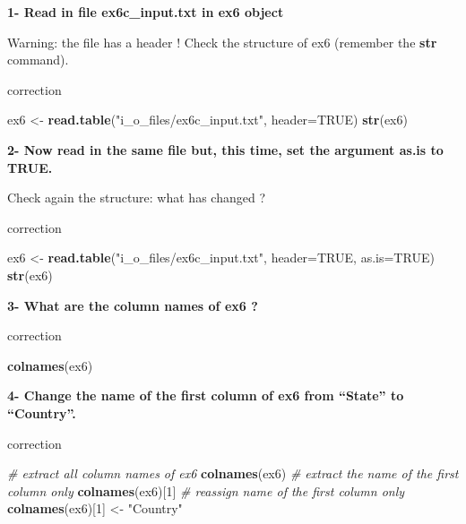 \documentclass[]{book}
\newenvironment{Shaded}{\begin{snugshade}}{\end{snugshade}}
\newcommand{\CommentTok}[1]{\textcolor[rgb]{0.56,0.35,0.01}{\textit{#1}}}
\newcommand{\DataTypeTok}[1]{\textcolor[rgb]{0.13,0.29,0.53}{#1}}
\newcommand{\DecValTok}[1]{\textcolor[rgb]{0.00,0.00,0.81}{#1}}
\newcommand{\KeywordTok}[1]{\textcolor[rgb]{0.13,0.29,0.53}{\textbf{#1}}}
\newcommand{\NormalTok}[1]{#1}
\newcommand{\OtherTok}[1]{\textcolor[rgb]{0.56,0.35,0.01}{#1}}
\newcommand{\StringTok}[1]{\textcolor[rgb]{0.31,0.60,0.02}{#1}}
\begin{document}
\textbf{1- Read in file ex6c\_input.txt in ex6 object}

Warning: the file has a header !
Check the structure of ex6 (remember the \textbf{str} command).

correction

\begin{Shaded}
\begin{Highlighting}[]
\NormalTok{ex6 <-}\StringTok{ }\KeywordTok{read.table}\NormalTok{(}\StringTok{"i_o_files/ex6c_input.txt"}\NormalTok{, }
                  \DataTypeTok{header=}\OtherTok{TRUE}\NormalTok{)}
\KeywordTok{str}\NormalTok{(ex6)}
\end{Highlighting}
\end{Shaded}

\textbf{2- Now read in the same file but, this time, set the argument as.is to TRUE.}

Check again the structure: what has changed ?

correction

\begin{Shaded}
\begin{Highlighting}[]
\NormalTok{ex6 <-}\StringTok{ }\KeywordTok{read.table}\NormalTok{(}\StringTok{"i_o_files/ex6c_input.txt"}\NormalTok{, }
                  \DataTypeTok{header=}\OtherTok{TRUE}\NormalTok{,}
                  \DataTypeTok{as.is=}\OtherTok{TRUE}\NormalTok{)}
\KeywordTok{str}\NormalTok{(ex6)}
\end{Highlighting}
\end{Shaded}

\textbf{3- What are the column names of ex6 ?}

correction

\begin{Shaded}
\begin{Highlighting}[]
\KeywordTok{colnames}\NormalTok{(ex6)}
\end{Highlighting}
\end{Shaded}

\textbf{4- Change the name of the first column of ex6 from ``State'' to ``Country''.}

correction

\begin{Shaded}
\begin{Highlighting}[]
\CommentTok{# extract all column names of ex6}
\KeywordTok{colnames}\NormalTok{(ex6)}
\CommentTok{# extract the name of the first column only}
\KeywordTok{colnames}\NormalTok{(ex6)[}\DecValTok{1}\NormalTok{]}
\CommentTok{# reassign name of the first column only}
\KeywordTok{colnames}\NormalTok{(ex6)[}\DecValTok{1}\NormalTok{] <-}\StringTok{ "Country"}
\end{Highlighting}
\end{Shaded}
\end{document}
